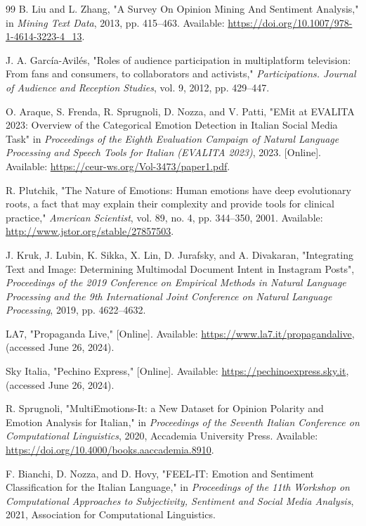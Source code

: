 \documentclass[letterpaper,journal]{IEEEtran}
\begin{document}
\begin{thebibliography}{99}
 B. Liu and L. Zhang, "A Survey On Opinion Mining And Sentiment Analysis," in \textit{Mining Text Data}, 2013, pp. 415--463. Available: \url{https://doi.org/10.1007/978-1-4614-3223-4_13}.

 J. A. Garc\'ia-Avil\'es, "Roles of audience participation in multiplatform television: From fans and consumers, to collaborators and activists," \textit{Participations. Journal of Audience and Reception Studies}, vol. 9, 2012, pp. 429--447.

 O. Araque, S. Frenda, R. Sprugnoli, D. Nozza, and V. Patti, "EMit at EVALITA 2023: Overview of the Categorical Emotion Detection in Italian Social Media Task" in \textit{Proceedings of the Eighth Evaluation Campaign of Natural Language Processing and Speech Tools for Italian (EVALITA 2023)}, 2023. [Online]. Available: \url{https://ceur-ws.org/Vol-3473/paper1.pdf}.

 R. Plutchik, "The Nature of Emotions: Human emotions have deep evolutionary roots, a fact that may explain their complexity and provide tools for clinical practice," \textit{American Scientist}, vol. 89, no. 4, pp. 344--350, 2001. Available: \url{http://www.jstor.org/stable/27857503}.

 J. Kruk, J. Lubin, K. Sikka, X. Lin, D. Jurafsky, and A. Divakaran, "Integrating Text and Image: Determining Multimodal Document Intent in Instagram Posts", \textit{Proceedings of the 2019 Conference on Empirical Methods in Natural Language Processing and the 9th International Joint Conference on Natural Language Processing}, 2019, pp. 4622--4632.

 LA7, "Propaganda Live," [Online]. Available: \url{https://www.la7.it/propagandalive}, (accessed June 26, 2024).

 Sky Italia, "Pechino Express," [Online]. Available: \url{https://pechinoexpress.sky.it}, (accessed June 26, 2024).

 R. Sprugnoli, "MultiEmotions-It: a New Dataset for Opinion Polarity and Emotion Analysis for Italian," in \textit{Proceedings of the Seventh Italian Conference on Computational Linguistics}, 2020, Accademia University Press. Available: \url{https://doi.org/10.4000/books.aaccademia.8910}.

 F. Bianchi, D. Nozza, and D. Hovy, "FEEL-IT: Emotion and Sentiment Classification for the Italian Language," in \textit{Proceedings of the 11th Workshop on Computational Approaches to Subjectivity, Sentiment and Social Media Analysis}, 2021, Association for Computational Linguistics.


\end{thebibliography}
\end{document}
